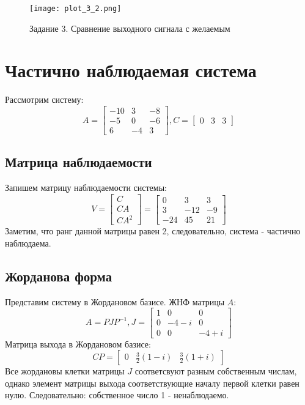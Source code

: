 \begin{figure}[]
    \centering
    \texttt{[image: plot\_3\_2.png]}
    \caption{\label{fig:The-caption-1}Задание 3. Сравнение выходного сигнала с желаемым}
\end{figure}
\pagebreak


\section{Частично наблюдаемая система}
Рассмотрим систему:
\begin{equation*}
    A = \begin{bmatrix}
        -10 & 3 & -8 \\
        -5 & 0 & -6 \\
        6 & -4 & 3
    \end{bmatrix},
    C = \begin{bmatrix}
        0 & 3 & 3
    \end{bmatrix}
\end{equation*}

\subsection{Матрица наблюдаемости}
Запишем матрицу наблюдаемости системы:
\begin{equation*}
    V = \begin{bmatrix}
        C \\ CA \\ CA^2
    \end{bmatrix}
     = 
    \begin{bmatrix}
        0 & 3 & 3 \\
        3 & -12 & -9 \\
        -24 & 45 & 21
    \end{bmatrix}
\end{equation*}
Заметим, что ранг данной матрицы равен 2, следовательно, система - частично наблюдаема.

\subsection{Жорданова форма}
Представим систему в Жордановом базисе. ЖНФ матрицы $A$:
\begin{equation*}
    A = PJP^{-1},
    J = \begin{bmatrix}
        1 & 0 & 0 \\
        0 & -4-i & 0 \\
        0 & 0 & -4+i
    \end{bmatrix}
\end{equation*}
Матрица выхода в Жордановом базисе:
\begin{equation*}
    CP = \begin{bmatrix}
        0 & \frac{3}{2}(1-i) & \frac{3}{2}(1+i)
    \end{bmatrix}
\end{equation*}
Все жордановы клетки матрицы $J$ соответсвуют разным собственным числам, однако элемент матрицы выхода 
соответствующие началу первой клетки равен нулю. Следовательно: собственное число 1 - ненаблюдаемо.

